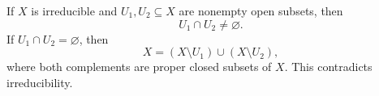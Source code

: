 \begin{lemma}{
    If $X$ is irreducible and $U_1,U_2\subseteq X$ are nonempty open subsets, then
    \[
        U_1\cap U_2\neq \varnothing.
    \]
}
    If $U_1\cap U_2 = \varnothing$, then
    \[
        X = (X\setminus U_1)\cup (X\setminus U_2),
    \]
    where both complements are proper closed subsets of $X$.
    This contradicts irreducibility.
\end{lemma}